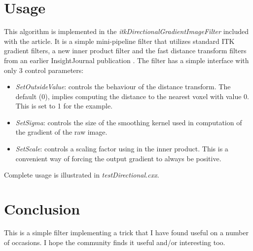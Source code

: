 \documentclass{InsightArticle}
\begin{document}
\section{Usage}
This algorithm is implemented in the {\em
  itkDirectionalGradientImageFilter} included with the article. It is
a simple mini-pipeline filter that utilizes standard ITK gradient
filters, a new inner product filter and the fast distance transform
filters from an earlier InsightJournal publication \cite{Beare2008e}. The filter has a simple interface with only 3 control parameters:
\begin{itemize}
\item {\em SetOutsideValue}: controls the behaviour of the distance transform. The default (0), implies computing the distance to the nearest voxel with value 0. This is set to 1 for the example.
\item {\em SetSigma}: controls the size of the smoothing kernel used in computation of the gradient of the raw image.
\item {\em SetScale}: controls a scaling factor using in the inner product. This is a convenient way of forcing the output gradient to always be positive. 
\end{itemize}
Complete usage is illustrated in {\em testDirectional.cxx}.

\section{Conclusion}
This is a simple filter implementing a trick that I have found useful
on a number of occasions. I hope the community finds it useful and/or
interesting too.

 
\nocite{ITKSoftwareGuide}
\end{document}
